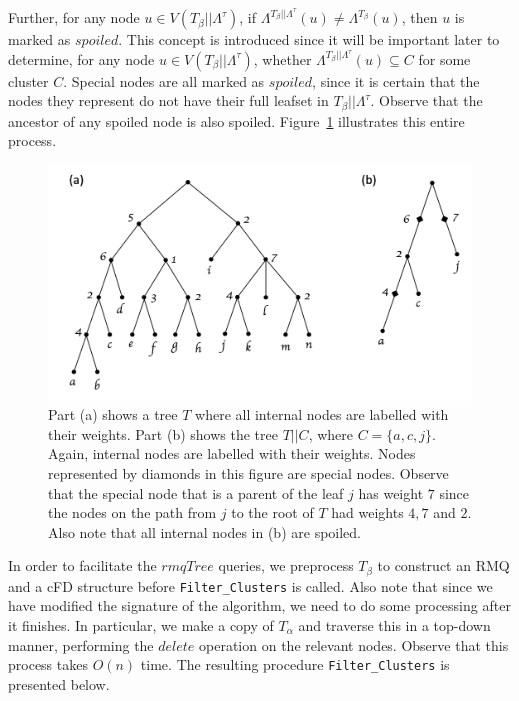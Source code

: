 \documentclass{article}
\newcommand{\leafset}{\Lambda}
\newcommand{\TA}{T_\alpha}
\newcommand{\TB}{T_\beta}
\begin{document}
    Further, for any node $u \in V(\TB||\leafset^{\tau})$, if $\leafset^{\TB||\leafset^{\tau}}(u) \neq \leafset^{\TB}(u)$, then $u$ is marked as $spoiled$. This concept is introduced since it will be important later to determine, for any node $u \in V(\TB||\leafset^{\tau})$, whether $\leafset^{\TB||\leafset^{\tau}}(u) \subseteq C$ for some cluster $C$. Special nodes are all marked as $spoiled$, since it is certain that the nodes they represent do not have their full leafset in $\TB||\leafset^{\tau}$. Observe that the ancestor of any spoiled node is also spoiled. Figure~\ref{fig:specialnodes} illustrates this entire process.

    \begin{figure}[ht]
        \includegraphics[scale=0.5]{specialnodes}
        \centering
        \caption[Constructing the tree $T||C$]{Part (a) shows a tree $T$ where all internal nodes are labelled with their weights. Part (b) shows the tree $T||C$, where $C = \{a, c, j\}$. Again, internal nodes are labelled with their weights. Nodes represented by diamonds in this figure are special nodes. Observe that the special node that is a parent of the leaf $j$ has weight $7$ since the nodes on the path from $j$ to the root of $T$ had weights $4, 7$ and $2$. Also note that all internal nodes in (b) are spoiled.}
        \label{fig:specialnodes}
    \end{figure}

    In order to facilitate the $rmqTree$ queries, we preprocess $\TB$ to construct an RMQ and a cFD structure before \texttt{Filter\_Clusters} is called. Also note that since we have modified the signature of the algorithm, we need to do some processing after it finishes. In particular, we make a copy of $\TA$ and traverse this in a top-down manner, performing the $delete$ operation on the relevant nodes. Observe that this process takes $O(n)$ time. The resulting procedure \texttt{Filter\_Clusters} is presented below.
\end{document}
